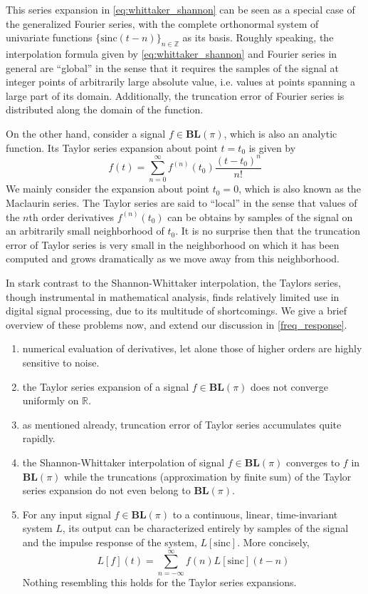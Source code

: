\documentclass[11pt,oneside]{book}
\theoremstyle{plain}
\theoremstyle{definition}
\theoremstyle{remark}
\begin{document}
This series expansion in \cref{eq:whittaker_shannon} can be seen as a special case of the 
generalized Fourier series, with the complete orthonormal system of univariate functions 
$\{ \mathrm{sinc}(t-n) \}_{n\in\mathbb{Z}}$ as its basis. Roughly speaking, the interpolation
formula given by \cref{eq:whittaker_shannon} and Fourier series in general are ``global'' in 
the sense that it requires the samples of the signal at integer points of arbitrarily large 
absolute value, i.e. values at points spanning a large part of its domain. Additionally, 
the truncation error of Fourier series is distributed along the domain of the function.

On the other hand, consider a signal $f \in \mathbf{BL}(\pi)$, which is also an analytic 
function. Its Taylor series expansion about point $t=t_0$ is given by
\begin{equation} \label{eq:taylor}
  f(t) = \sum_{n=0}^{\infty} f^{(n)}(t_0) \frac{(t-t_0)^n}{n!}
\end{equation}
We mainly consider the expansion about point $t_0=0$, which is also known as the Maclaurin series.
The Taylor series are said to ``local'' in the sense that values of the $n$th order derivatives 
$f^{(n)}(t_0)$ can be obtains by samples of the signal on an arbitrarily small neighborhood
of $t_0$. It is no surprise then that the truncation error of Taylor series is very small in the 
neighborhood on which it has been computed and grows dramatically as we move away from this neighborhood.

In stark contrast to the Shannon-Whittaker interpolation, the Taylors series, though 
instrumental in mathematical analysis, finds relatively limited use in digital signal 
processing, due to its multitude of shortcomings. We give a brief overview of these problems
now, and extend our discussion in \cref{freq_response}.

\begin{enumerate}
  \item numerical evaluation of derivatives, let alone those of higher orders are
    highly sensitive to noise.
  \item the Taylor series expansion of a signal $f \in \mathbf{BL}(\pi)$ does not
    converge uniformly on $\mathbb{R}$.
  \item as mentioned already, truncation error of Taylor series accumulates quite rapidly.
  \item the Shannon-Whittaker interpolation of signal $f \in \mathbf{BL}(\pi)$ converges
    to $f$ in $\mathbf{BL}(\pi)$ while the truncations (approximation by finite sum) of the
    Taylor series expansion do not even belong to $\mathbf{BL}(\pi)$.
  \item For any input signal $f \in \mathbf{BL}(\pi)$ to a continuous, linear, time-invariant 
    system $L$, its output can be characterized entirely by samples of the signal 
    and the impulse response of the system, $L[\mathrm{sinc}]$. More concisely,
    \begin{equation}
      L[f](t) = \sum_{n=-\infty}^{\infty} f(n) L[\mathrm{sinc}](t-n)
    \end{equation}
    Nothing resembling this holds for the Taylor series expansions.
\end{enumerate}
\end{document}
